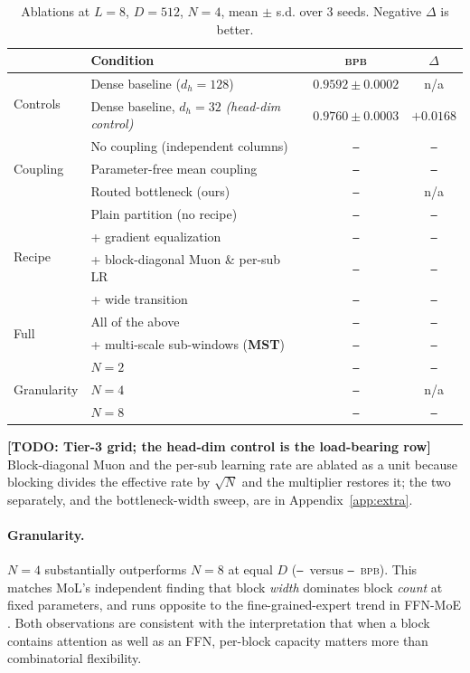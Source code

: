 \documentclass{article}
\newcommand{\TODO}[1]{{\color{red}\textbf{[TODO: #1]}}}
\newcommand{\PH}{{\color{red}\texttt{--}}}   %
\newcommand{\bpb}{\textsc{bpb}}
\newcommand{\dmodel}{D}
\newcommand{\nsub}{N}
\begin{document}
\begin{table}[t]
\caption{Ablations at $L{=}8$, $\dmodel{=}512$, $\nsub{=}4$, mean $\pm$ s.d. over
3 seeds. Negative $\Delta$ is better.}
\label{tab:ablation}
\begin{center}
\begin{small}
\begin{tabular}{llcc}
\toprule
& Condition & \bpb & $\Delta$ \\
\midrule
\multirow{2}{*}{Controls}
 & Dense baseline ($d_h{=}128$)                & $0.9592\pm0.0002$ & n/a \\
 & Dense baseline, $d_h{=}32$ \emph{(head-dim control)} & $0.9760\pm0.0003$ & $+0.0168$ \\
\midrule
\multirow{3}{*}{Coupling}
 & No coupling (independent columns)           & \PH & \PH \\
 & Parameter-free mean coupling                & \PH & \PH \\
 & Routed bottleneck (ours)                    & \PH & n/a \\
\midrule
\multirow{4}{*}{Recipe}
 & Plain partition (no recipe)                 & \PH & \PH \\
 & \; + gradient equalization                  & \PH & \PH \\
 & \; + block-diagonal Muon \& per-sub LR      & \PH & \PH \\
 & \; + wide transition                        & \PH & \PH \\
\midrule
\multirow{2}{*}{Full}
 & All of the above                            & \PH & \PH \\
 & \; + multi-scale sub-windows (\textbf{MST}) & \PH & \PH \\
\midrule
\multirow{3}{*}{Granularity}
 & $\nsub{=}2$ & \PH & \PH \\
 & $\nsub{=}4$ & \PH & n/a \\
 & $\nsub{=}8$ & \PH & \PH \\
\bottomrule
\end{tabular}
\end{small}
\end{center}
\TODO{Tier-3 grid; the head-dim control is the load-bearing row}
Block-diagonal Muon and the per-sub learning rate are ablated as a unit because
blocking divides the effective rate by $\sqrt{\nsub}$ and the multiplier restores
it; the two separately, and the bottleneck-width sweep, are in
Appendix~\ref{app:extra}.
\end{table}

\paragraph{Granularity.} $\nsub{=}4$ substantially outperforms $\nsub{=}8$ at
equal $\dmodel$ (\PH\ versus \PH\ \bpb). This matches MoL's independent finding
that block \emph{width} dominates block \emph{count} at fixed parameters, and runs
opposite to the fine-grained-expert trend in FFN-MoE
\citep{dai2024deepseekmoe}. Both observations are consistent with the
interpretation that when a block contains attention as well as an FFN, per-block
capacity matters more than combinatorial flexibility.
\end{document}
